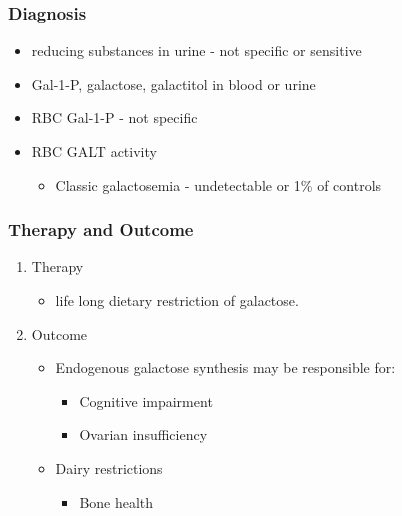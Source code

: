 \documentclass{scrartcl}
\begin{document}




\subsubsection{Diagnosis}
\label{sec:orgc0a508f}
\begin{itemize}
\item reducing substances in urine - not specific or sensitive
\item Gal-1-P, galactose, galactitol in blood or urine
\item RBC Gal-1-P - not specific
\item RBC GALT activity
\begin{itemize}
\item Classic galactosemia - undetectable or 1\% of controls
\end{itemize}
\end{itemize}

\subsubsection{Therapy and Outcome}
\label{sec:org90116a3}

\begin{enumerate}
\item Therapy
\label{sec:org450a5d3}
\begin{itemize}
\item life long dietary restriction of galactose.
\end{itemize}

\item Outcome
\label{sec:org7a1a4da}
\begin{itemize}
\item Endogenous galactose synthesis may be responsible for:
\begin{itemize}
\item Cognitive impairment
\item Ovarian insufficiency
\end{itemize}
\item Dairy restrictions
\begin{itemize}
\item Bone health
\end{itemize}
\end{itemize}
\end{enumerate}
\end{document}
